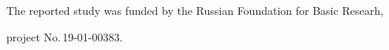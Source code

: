 

  


  


















\Ack


  \noindent


  The reported study was funded by the Russian Foundation for Basic Researh, 


project No.\,19-01-00383.





 














